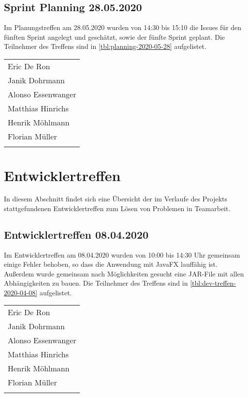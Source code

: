 	\subsection{Sprint Planning 28.05.2020}
	Im Planungstreffen am 28.05.2020 wurden von 14:30 bis 15:10 die Issues für den fünften Sprint angelegt und geschätzt, sowie der fünfte Sprint geplant. Die Teilnehmer des Treffens sind in \autoref{tbl:planning-2020-05-28} aufgelistet.
		\begin{tabularx}{0.75\textwidth}{l}
			\hline
			\endhead
			Eric De Ron\\
			Janik Dohrmann\\
			Alonso Essenwanger\\
			Matthias Hinrichs\\
			Henrik Möhlmann\\
			Florian Müller\\
			\hline
			\caption{Teilnehmer 28.05.2020}
			\label{tbl:planning-2020-05-28}
		\end{tabularx}
\section{Entwicklertreffen}
\label{sec:dev-treffen}
In diesem Abschnitt findet sich eine Übersicht der im Verlaufe des Projekts stattgefundenen Entwicklertreffen zum Lösen von Problemen in Teamarbeit.
	\subsection{Entwicklertreffen 08.04.2020}
		Im Entwicklertreffen am 08.04.2020 wurden von 10:00 bis 14:30 Uhr gemeinsam einige Fehler behoben, so dass die Anwendung mit JavaFX lauffähig ist. Außerdem wurde gemeinsam nach Möglichkeiten gesucht eine JAR-File mit allen Abhängigkeiten zu bauen. Die Teilnehmer des Treffens sind in \autoref{tbl:dev-treffen-2020-04-08} aufgelistet.
		\begin{tabularx}{0.75\textwidth}{l}
			\hline
			\endhead
			Eric De Ron\\
			Janik Dohrmann\\
			Alonso Essenwanger\\
			Matthias Hinrichs\\
			Henrik Möhlmann\\
			Florian Müller\\
			\hline
			\caption{Teilnehmer 08.04.2020}
			\label{tbl:dev-treffen-2020-04-08}
		\end{tabularx}
